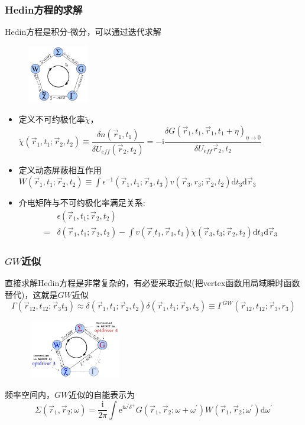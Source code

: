 \documentclass[cjk,slidestop,compress,mathserif,blue]{beamer}
\begin{document}
\frame
{
	\frametitle{\textrm{Hedin}方程的求解} 
	\textrm{Hedin}方程是积分-微分，可以通过迭代求解
\begin{figure}[h!]
\centering
\vspace{-10pt}
\includegraphics[height=1.0in,width=1.05in,viewport=5 5 330 335,clip]{Figures/GW-1.png}
\label{GW-1}
\end{figure}
	\begin{itemize}
			\vspace{-15pt}
		\item 定义不可约极化率$\tilde\chi$，$\tilde\chi(\vec r_1,t_1;\vec r_2,t_2)\equiv\dfrac{\delta n(\vec r_1,t_1)}{\delta U_{e\!f\!f}(\vec r_2,t_2)}=-\mathrm{i}\dfrac{\delta G(\vec r_1,t_1,\vec r_1,t_1+\eta)_{\eta\rightarrow0}}{\delta U_{e\!f\!f}{\vec r_2,t_2}}$
		\item 定义动态屏蔽相互作用$W(\vec r_1,t_1;\vec r_2,t_2)\equiv\int\epsilon^{-1}(\vec r_1,t_1;\vec r_3,t_3)v(\vec r_3,r_3;\vec r_2,t_2)\mathrm{d}t_3\mathrm{d}\vec r_3$
		\item 介电矩阵与不可约极化率满足关系:
			\begin{displaymath}
				\begin{aligned}
					&\epsilon(\vec r_1,t_1;\vec r_2,t_2)\\
					=&\delta(\vec r_1,t_1;\vec r_2,t_2)-\int v(\vec r_,t_1,\vec r_3,t_3)\tilde\chi(\vec r_3,t_3;\vec r_2,t_2)\mathrm{d}t_3\mathrm{d}\vec r_3
				\end{aligned}
			\end{displaymath}
	\end{itemize}

}

\frame
{
	\frametitle{$GW$近似}
	直接求解\textrm{Hedin}方程是非常复杂的，有必要采取近似(把\textrm{vertex}函数用局域瞬时函数替代)，这就是$GW$近似
	$$\Gamma(\vec r_{12},t_{12};\vec r_3t_3)\approx\delta(\vec r_1,t_1;\vec r_2,t_2)\delta(\vec r_1,t_1;\vec r_3,t_3)\equiv\Gamma^{GW}(\vec r_{12},t_{12};\vec r_3,r_3)$$
\begin{figure}[h!]
\centering
\vspace{-15pt}
\includegraphics[height=1.0in,width=1.65in,viewport=5 5 530 320,clip]{Figures/GW-3.png}
\label{GW-2}
\end{figure}
频率空间内，$GW$近似的自能表示为
$$\Sigma(\vec r_1,\vec r_2;\omega)=\dfrac{\mathrm i}{2\pi}\int \mathrm e^{\mathrm i\omega^{\prime}\delta^+}G(\vec r_1,\vec r_2;\omega+\omega^{\prime})W(\vec r_1,\vec r_2;\omega^{\prime})\mathrm{d}\omega^{\prime}$$
}
\end{document}
